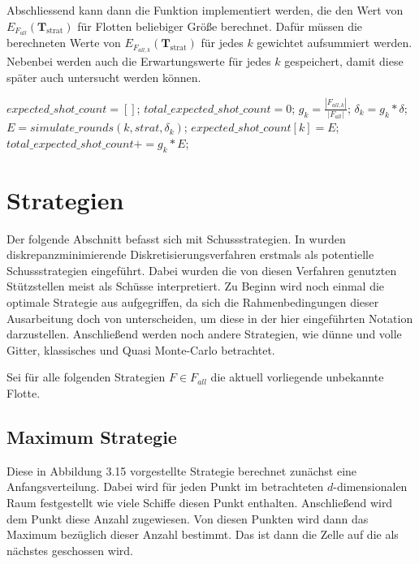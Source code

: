 \documentclass[a4paper,12pt]{llncs}
\numberwithin{equation}{section}
\DeclareMathOperator{\strat}{strat}
\begin{document}
Abschliessend kann dann die Funktion implementiert werden, die den Wert von $E_{F_{all}}(\mathbf{T}_{\strat})$ für Flotten beliebiger Größe berechnet. Dafür müssen die berechneten Werte von $E_{F_{all,k}}(\mathbf{T}_{\strat})$ für jedes $k$ gewichtet aufsummiert werden. Nebenbei werden auch die Erwartungswerte für jedes $k$ gespeichert, damit diese später auch untersucht werden können.

\begin{tcolorbox}
\begin{algorithmic}[H]
	\State $expected\_shot\_count=[]$;
	\State $total\_expected\_shot\_count=0$;
	\State $g_k=\frac{|F_{all,k}|}{|F_{all}|}$;
	\State $\delta_k=g_k * \delta$;
	\State $E=simulate\_rounds(k, strat, \delta_k)$;
	\State $expected\_shot\_count[k] = E$;
	\State $total\_expected\_shot\_count+=g_k * E$;
	\EndFor
	\EndFunction
\end{algorithmic}
\end{tcolorbox}


\section{Strategien}

Der folgende Abschnitt befasst sich mit Schussstrategien. In \cite{M13} wurden diskrepanzminimierende Diskretisierungsverfahren erstmals als potentielle Schussstrategien eingeführt. Dabei wurden die von diesen Verfahren genutzten Stützstellen meist als Schüsse interpretiert. Zu Beginn wird noch einmal die optimale Strategie aus \cite{M13} aufgegriffen, da sich die Rahmenbedingungen dieser Ausarbeitung doch von \cite{M13} unterscheiden, um diese in der hier eingeführten Notation darzustellen. Anschließend werden noch andere Strategien, wie dünne und volle Gitter, klassisches und Quasi Monte-Carlo betrachtet. 

Sei für alle folgenden Strategien $F\in F_{all}$ die aktuell vorliegende unbekannte Flotte.

\subsection{Maximum Strategie}

Diese in \cite{M13} Abbildung 3.15 vorgestellte Strategie berechnet zunächst eine Anfangsverteilung. Dabei wird für jeden Punkt im betrachteten $d$-dimensionalen Raum festgestellt wie viele Schiffe diesen Punkt enthalten. Anschließend wird dem Punkt diese Anzahl zugewiesen. Von diesen Punkten wird dann das Maximum bezüglich dieser Anzahl bestimmt. Das ist dann die Zelle auf die als nächstes geschossen wird.
\end{document}
